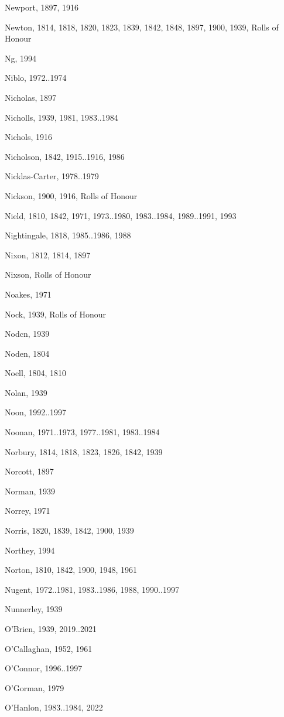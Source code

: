 \begin{theindex}
\item Newport, 1897, 1916
\item Newton, 1814, 1818, 1820, 1823, 1839, 1842, 1848, 1897, 1900, 1939, Rolls of Honour
\item Ng, 1994
\item Niblo, 1972..1974
\item Nicholas, 1897
\item Nicholls, 1939, 1981, 1983..1984
\item Nichols, 1916
\item Nicholson, 1842, 1915..1916, 1986
\item Nicklas-Carter, 1978..1979
\item Nickson, 1900, 1916, Rolls of Honour
\item Nield, 1810, 1842, 1971, 1973..1980, 1983..1984, 1989..1991, 1993
\item Nightingale, 1818, 1985..1986, 1988
\item Nixon, 1812, 1814, 1897
\item Nixson, Rolls of Honour
\item Noakes, 1971
\item Nock, 1939, Rolls of Honour
\item Nodcn, 1939
\item Noden, 1804
\item Noell, 1804, 1810
\item Nolan, 1939
\item Noon, 1992..1997
\item Noonan, 1971..1973, 1977..1981, 1983..1984
\item Norbury, 1814, 1818, 1823, 1826, 1842, 1939
\item Norcott, 1897
\item Norman, 1939
\item Norrey, 1971
\item Norris, 1820, 1839, 1842, 1900, 1939
\item Northey, 1994
\item Norton, 1810, 1842, 1900, 1948, 1961
\item Nugent, 1972..1981, 1983..1986, 1988, 1990..1997
\item Nunnerley, 1939
\item O'Brien, 1939, 2019..2021
\item O'Callaghan, 1952, 1961
\item O'Connor, 1996..1997
\item O'Gorman, 1979
\item O'Hanlon, 1983..1984, 2022

\end{theindex}
